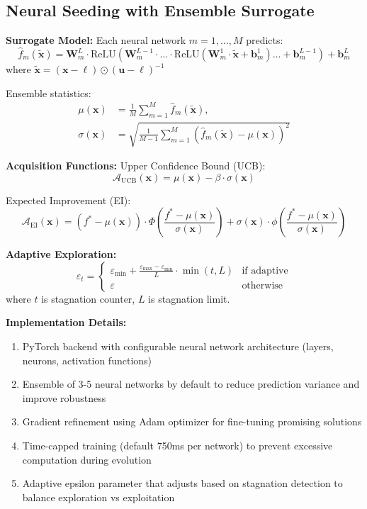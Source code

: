 \documentclass[12pt,a4paper]{article}
\begin{document}
\subsection{Neural Seeding with Ensemble Surrogate}
\textbf{Surrogate Model:}
Each neural network $m = 1, \dots, M$ predicts:
\begin{equation}
\hat{f}_m(\tilde{\bm{x}}) = \bm{W}_m^L \cdot \text{ReLU}(\bm{W}_m^{L-1} \cdot \dots \cdot \text{ReLU}(\bm{W}_m^1 \cdot \tilde{\bm{x}} + \bm{b}_m^1) \dots + \bm{b}_m^{L-1}) + \bm{b}_m^L \label{eq:neural_forward}
\end{equation}
where $\tilde{\bm{x}} = (\bm{x} - \bm{\ell}) \odot (\bm{u} - \bm{\ell})^{-1}$

Ensemble statistics:
\begin{align}
\mu(\bm{x}) &= \frac{1}{M} \sum_{m=1}^M \hat{f}_m(\tilde{\bm{x}}), \label{eq:ensemble_mean} \\
\sigma(\bm{x}) &= \sqrt{\frac{1}{M-1} \sum_{m=1}^M (\hat{f}_m(\tilde{\bm{x}}) - \mu(\bm{x}))^2} \label{eq:ensemble_std}
\end{align}

\textbf{Acquisition Functions:}
Upper Confidence Bound (UCB):
\begin{equation}
\mathcal{A}_{\text{UCB}}(\bm{x}) = \mu(\bm{x}) - \beta \cdot \sigma(\bm{x}) \label{eq:ucb_acquisition}
\end{equation}

Expected Improvement (EI):
\begin{equation}
\mathcal{A}_{\text{EI}}(\bm{x}) = (f^* - \mu(\bm{x})) \cdot \Phi\left(\frac{f^* - \mu(\bm{x})}{\sigma(\bm{x})}\right) + \sigma(\bm{x}) \cdot \phi\left(\frac{f^* - \mu(\bm{x})}{\sigma(\bm{x})}\right) \label{eq:ei_acquisition}
\end{equation}

\textbf{Adaptive Exploration:}
\begin{equation}
\varepsilon_t = \begin{cases}
\varepsilon_{\min} + \frac{\varepsilon_{\max} - \varepsilon_{\min}}{L} \cdot \min(t, L) & \text{if adaptive} \\
\varepsilon & \text{otherwise}
\end{cases} \label{eq:adaptive_epsilon}
\end{equation}
where $t$ is stagnation counter, $L$ is stagnation limit.

\textbf{Implementation Details:}
\begin{enumerate}
\item PyTorch backend with configurable neural network architecture (layers, neurons, activation functions)
\item Ensemble of 3-5 neural networks by default to reduce prediction variance and improve robustness
\item Gradient refinement using Adam optimizer for fine-tuning promising solutions
\item Time-capped training (default 750ms per network) to prevent excessive computation during evolution
\item Adaptive epsilon parameter that adjusts based on stagnation detection to balance exploration vs exploitation
\end{enumerate}
\end{document}
